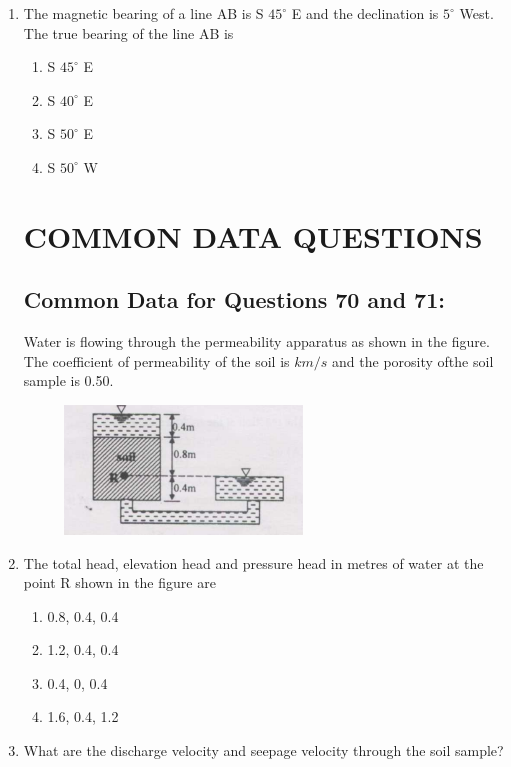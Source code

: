 \documentclass[journal,12pt,onecolumn]{IEEEtran}
\theoremstyle{remark}
\begin{document}
\begin{enumerate}
\item The magnetic bearing of a line AB is S $45^\circ$ E and the declination is $5^\circ$ West. The true bearing of the line AB is

\hfill{}
\begin{enumerate}
\item S $45^\circ$ E
\item S $40^\circ$ E
\item S $50^\circ$ E
\item S $50^\circ$ W
\end{enumerate}

\section*{COMMON DATA QUESTIONS}

\subsection*{Common Data for Questions 70 and 71:}
Water is flowing through the permeability apparatus as shown in the figure. The coefficient of permeability of the soil is $k m/s$ and the porosity ofthe soil sample is 0.50.

\begin{figure}[H]
\centering
\includegraphics[width=0.5\columnwidth]{figs/q70,71.png}
\caption*{}
\label{fig:Q.70,71}
\end{figure}

\item The total head, elevation head and pressure head in metres of water at the point R shown in the figure are

\hfill{}
\begin{enumerate}
\item 0.8, 0.4, 0.4
\item 1.2, 0.4, 0.4
\item 0.4, 0, 0.4
\item 1.6, 0.4, 1.2
\end{enumerate}

\item What are the discharge velocity and seepage velocity through the soil sample?


\end{enumerate}
\end{document}

